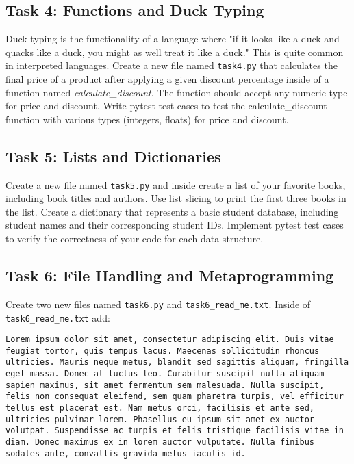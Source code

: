 \documentclass{article}
\begin{document}
\subsection{Task 4: Functions and Duck Typing}
Duck typing is the functionality of a language where "if it looks like a duck and quacks like a duck, you might as well treat it like a duck." This is quite common in interpreted languages. Create a new file named \verb|task4.py| that calculates the final price of a product after applying a given discount percentage inside of a function named \textit{calculate\_discount}. The function should accept any numeric type for price and discount. Write pytest test cases to test the calculate\_discount function with various types (integers, floats) for price and discount.

\subsection{Task 5: Lists and Dictionaries}
Create a new file named \verb|task5.py| and inside create a list of your favorite books, including book titles and authors. Use list slicing to print the first three books in the list. Create a dictionary that represents a basic student database, including student names and their corresponding student IDs. Implement pytest test cases to verify the correctness of your code for each data structure.


\subsection{Task 6: File Handling and Metaprogramming}
Create two new files named \verb|task6.py| and \verb|task6_read_me.txt|. Inside of \verb|task6_read_me.txt| add:
\begin{center} %
\begin{lstlisting}[style=customcode]
Lorem ipsum dolor sit amet, consectetur adipiscing elit. Duis vitae feugiat tortor, quis tempus lacus. Maecenas sollicitudin rhoncus ultricies. Mauris neque metus, blandit sed sagittis aliquam, fringilla eget massa. Donec at luctus leo. Curabitur suscipit nulla aliquam sapien maximus, sit amet fermentum sem malesuada. Nulla suscipit, felis non consequat eleifend, sem quam pharetra turpis, vel efficitur tellus est placerat est. Nam metus orci, facilisis et ante sed, ultricies pulvinar lorem. Phasellus eu ipsum sit amet ex auctor volutpat. Suspendisse ac turpis et felis tristique facilisis vitae in diam. Donec maximus ex in lorem auctor vulputate. Nulla finibus sodales ante, convallis gravida metus iaculis id.
\end{lstlisting}
\end{center}
\end{document}
